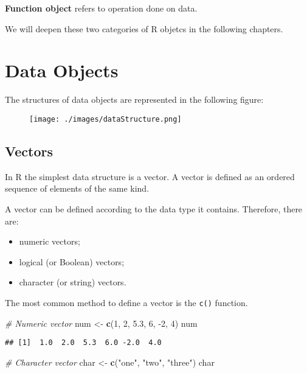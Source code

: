\documentclass[]{book}
\newenvironment{Shaded}{\begin{snugshade}}{\end{snugshade}}
\newcommand{\KeywordTok}[1]{\textcolor[rgb]{0.13,0.29,0.53}{\textbf{{#1}}}}
\newcommand{\DecValTok}[1]{\textcolor[rgb]{0.00,0.00,0.81}{{#1}}}
\newcommand{\FloatTok}[1]{\textcolor[rgb]{0.00,0.00,0.81}{{#1}}}
\newcommand{\StringTok}[1]{\textcolor[rgb]{0.31,0.60,0.02}{{#1}}}
\newcommand{\CommentTok}[1]{\textcolor[rgb]{0.56,0.35,0.01}{\textit{{#1}}}}
\newcommand{\NormalTok}[1]{{#1}}
\providecommand{\tightlist}{%
  \setlength{\itemsep}{0pt}\setlength{\parskip}{0pt}}
\def\tightlist{}
\begin{document}
\textbf{Function object} refers to operation done on data.

We will deepen these two categories of R objetcs in the following
chapters.

\clearpage

\section{Data Objects}\label{data-objects}

The structures of data objects are represented in the following figure:

\begin{figure}[htbp]
\centering
\texttt{[image: ./images/dataStructure.png]}
\caption{}
\end{figure}

\subsection{Vectors}\label{vectors}

In R the simplest data structure is a vector. A vector is defined as an
ordered sequence of elements of the same kind.

A vector can be defined according to the data type it contains.
Therefore, there are:

\begin{itemize}
\tightlist
\item
  numeric vectors;
\item
  logical (or Boolean) vectors;
\item
  character (or string) vectors.
\end{itemize}

The most common method to define a vector is the \texttt{c()} function.

\begin{Shaded}
\begin{Highlighting}[]
\CommentTok{# Numeric vector}
\NormalTok{num <-}\StringTok{ }\KeywordTok{c}\NormalTok{(}\DecValTok{1}\NormalTok{, }\DecValTok{2}\NormalTok{, }\FloatTok{5.3}\NormalTok{, }\DecValTok{6}\NormalTok{, -}\DecValTok{2}\NormalTok{, }\DecValTok{4}\NormalTok{)}
\NormalTok{num}
\end{Highlighting}
\end{Shaded}

\begin{verbatim}
## [1]  1.0  2.0  5.3  6.0 -2.0  4.0
\end{verbatim}

\begin{Shaded}
\begin{Highlighting}[]
\CommentTok{# Character vector}
\NormalTok{char <-}\StringTok{ }\KeywordTok{c}\NormalTok{(}\StringTok{"one"}\NormalTok{, }\StringTok{"two"}\NormalTok{, }\StringTok{"three"}\NormalTok{)}
\NormalTok{char}
\end{Highlighting}
\end{Shaded}
\end{document}
